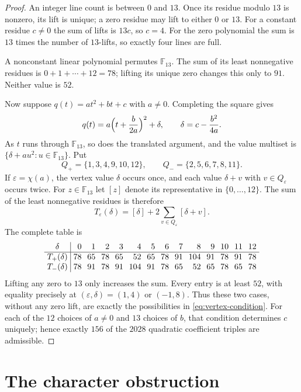 \documentclass[11pt]{amsart}
\theoremstyle{remark}
\newcommand{\F}{\mathbb F}
\begin{document}
\begin{proof}
An integer line count is between $0$ and $13$.  Once its residue modulo $13$
is nonzero, its lift is unique; a zero residue may lift to either $0$ or $13$.
For a constant residue $c\neq0$ the sum of lifts is $13c$, so $c=4$.  For the
zero polynomial the sum is $13$ times the number of $13$-lifts, so exactly
four lines are full.

A nonconstant linear polynomial permutes $\F_{13}$.  The sum of its least
nonnegative residues is $0+1+\cdots+12=78$; lifting its unique zero changes
this only to $91$.  Neither value is $52$.

Now suppose $q(t)=at^{2}+bt+c$ with $a\neq0$.  Completing the square gives
\[
  q(t)=a\Bigl(t+\frac{b}{2a}\Bigr)^{2}+\delta,
  \qquad
  \delta=c-\frac{b^{2}}{4a}.
\]
As $t$ runs through $\F_{13}$, so does the translated argument, and the value
multiset is $\{\delta+au^{2}:u\in\F_{13}\}$.  Put
\[
 Q_+=\{1,3,4,9,10,12\},\qquad Q_-=\{2,5,6,7,8,11\}.
\]
If $\varepsilon=\chi(a)$, the vertex value $\delta$ occurs once, and
each value $\delta+v$ with $v\in Q_\varepsilon$ occurs twice.
For $z\in\F_{13}$ let $[z]$ denote its representative in
$\{0,\ldots,12\}$.  The sum of the least nonnegative residues is therefore
\[
 T_\varepsilon(\delta)=[\delta]+2\sum_{v\in Q_\varepsilon}[\delta+v].
\]
The complete table is
\[
\setlength{\arraycolsep}{3.5pt}
\begin{array}{c|rrrrrrrrrrrrr}
\delta&0&1&2&3&4&5&6&7&8&9&10&11&12\\ \hline
T_+(\delta)&78&65&78&65&52&65&78&91&104&91&78&91&78\\
T_-(\delta)&78&91&78&91&104&91&78&65&52&65&78&65&78
\end{array}
\]
Lifting any zero to $13$ only increases the sum.  Every entry is at least
$52$, with equality precisely at $(\varepsilon,\delta)=(1,4)$ or
$(-1,8)$.  Thus these two cases, without any zero lift, are exactly the
possibilities in \eqref{eq:vertex-condition}.  For each of the $12$ choices
of $a\ne0$ and $13$ choices of $b$, that condition determines $c$ uniquely;
hence exactly $156$ of the $2028$ quadratic coefficient triples are admissible.
\end{proof}

\section{The character obstruction}
\end{document}
